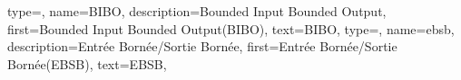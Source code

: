 {%
  type=\acronymtype,%
  name={BIBO},%
  description={Bounded Input Bounded Output},%
  first={\og Bounded Input Bounded Output\fg (BIBO)},%
  text={{\scshape BIBO}},%
}
{%
  type=\acronymtype,%
  name={ebsb},%
  description={Entrée Bornée/Sortie Bornée},%
  first={\og Entrée Bornée/Sortie Bornée\fg (EBSB)},%
  text={{\scshape EBSB}},%
}

